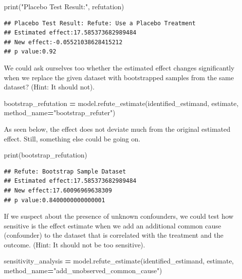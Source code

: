 \documentclass[
  12pt,
]{book}
\newenvironment{Shaded}{\begin{snugshade}}{\end{snugshade}}
\newcommand{\BuiltInTok}[1]{#1}
\newcommand{\NormalTok}[1]{#1}
\newcommand{\OperatorTok}[1]{\textcolor[rgb]{0.81,0.36,0.00}{\textbf{#1}}}
\newcommand{\StringTok}[1]{\textcolor[rgb]{0.31,0.60,0.02}{#1}}
\begin{document}
\begin{Shaded}
\begin{Highlighting}[]
\BuiltInTok{print}\NormalTok{(}\StringTok{"Placebo Test Result:"}\NormalTok{, refutation)}
\end{Highlighting}
\end{Shaded}

\begin{verbatim}
## Placebo Test Result: Refute: Use a Placebo Treatment
## Estimated effect:17.585373682989484
## New effect:-0.05521038628415212
## p value:0.92
\end{verbatim}

We could ask ourselves too whether the estimated effect changes significantly when we replace the given dataset with bootstrapped samples from the same dataset? (Hint: It should not).

\begin{Shaded}
\begin{Highlighting}[]
\NormalTok{bootstrap\_refutation }\OperatorTok{=}\NormalTok{ model.refute\_estimate(identified\_estimand, }
\NormalTok{                                 estimate, }
\NormalTok{                                 method\_name}\OperatorTok{=}\StringTok{"bootstrap\_refuter"}\NormalTok{)}
\end{Highlighting}
\end{Shaded}

As seen below, the effect does not deviate much from the original estimated effect. Still, something else could be going on.

\begin{Shaded}
\begin{Highlighting}[]
\BuiltInTok{print}\NormalTok{(bootstrap\_refutation)}
\end{Highlighting}
\end{Shaded}

\begin{verbatim}
## Refute: Bootstrap Sample Dataset
## Estimated effect:17.585373682989484
## New effect:17.60096969638309
## p value:0.8400000000000001
\end{verbatim}

If we suspect about the presence of unknown confounders, we could test how sensitive is the effect estimate when we add an additional common cause (confounder) to the dataset that is correlated with the treatment and the outcome. (Hint: It should not be too sensitive).

\begin{Shaded}
\begin{Highlighting}[]
\NormalTok{sensitivity\_analysis }\OperatorTok{=}\NormalTok{ model.refute\_estimate(identified\_estimand, }
\NormalTok{                      estimate, }
\NormalTok{                      method\_name}\OperatorTok{=}\StringTok{"add\_unobserved\_common\_cause"}\NormalTok{)}
\end{Highlighting}
\end{Shaded}
\end{document}
